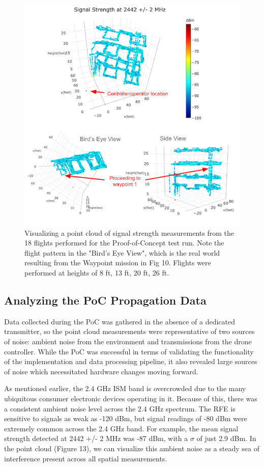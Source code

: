 \documentclass[pageno]{jpaper}
\begin{document}
\begin{figure}[!h]
 	\caption[Point cloud visualization from proof-of-concept 2.4 GHz test]{Visualizing a point cloud of signal strength measurements from the 18 flights performed for the Proof-of-Concept test run. Note the flight pattern in the "Bird's Eye View", which is the real world  resulting from the Waypoint mission in Fig 10. Flights were performed at heights of 8 ft, 13 ft, 20 ft, 26 ft.}
 	\includegraphics{PoC_1}
 	\centering
\end{figure}

\subsection{Analyzing the PoC Propagation Data}
Data collected during the PoC was gathered in the absence of a dedicated transmitter, so the point cloud measurements were representative of two sources of noise: ambient noise from the environment and transmissions from the drone controller. While the PoC was successful in terms of validating the functionality of the implementation and data processing pipeline, it also revealed large sources of noise which necessitated hardware changes moving forward.

As mentioned earlier, the 2.4 GHz ISM band is overcrowded due to the many ubiquitous consumer electronic devices operating in it. Because of this, there was a consistent ambient noise level across the 2.4 GHz spectrum. The RFE is sensitive to signals as weak as -120 dBm, but signal readings of -80 dBm were extremely common across the 2.4 GHz band. For example, the mean signal strength detected at 2442 +/- 2 MHz was -87 dBm, with a $\sigma$ of just 2.9 dBm. In the point cloud (Figure 13), we can visualize this ambient noise as a steady sea of interference present across all spatial measurements.
\end{document}
